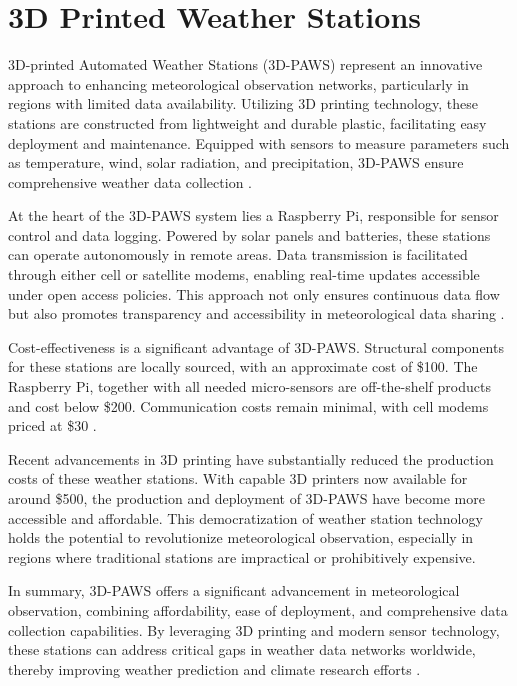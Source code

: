 \section{3D Printed Weather Stations}
\label{sec:3d_printed_stations}

3D-printed Automated Weather Stations (3D-PAWS) represent an innovative approach to enhancing meteorological observation networks, particularly in regions with limited data availability. Utilizing 3D printing technology, these stations are constructed from lightweight and durable plastic, facilitating easy deployment and maintenance. Equipped with sensors to measure parameters such as temperature, wind, solar radiation, and precipitation, 3D-PAWS ensure comprehensive weather data collection \cite{mwangi2017paws}.

At the heart of the 3D-PAWS system lies a Raspberry Pi, responsible for sensor control and data logging. Powered by solar panels and batteries, these stations can operate autonomously in remote areas. Data transmission is facilitated through either cell or satellite modems, enabling real-time updates accessible under open access policies. This approach not only ensures continuous data flow but also promotes transparency and accessibility in meteorological data sharing \cite{mwangi2017paws}.

Cost-effectiveness is a significant advantage of 3D-PAWS. Structural components for these stations are locally sourced, with an approximate cost of \$100. The Raspberry Pi, together with all needed micro-sensors are off-the-shelf products and cost below \$200. Communication costs remain minimal, with cell modems priced at \$30 \cite{mwangi2017paws}.

Recent advancements in 3D printing have substantially reduced the production costs of these weather stations. With capable 3D printers now available for around \$500, the production and deployment of 3D-PAWS have become more accessible and affordable. This democratization of weather station technology holds the potential to revolutionize meteorological observation, especially in regions where traditional stations are impractical or prohibitively expensive.

In summary, 3D-PAWS offers a significant advancement in meteorological observation, combining affordability, ease of deployment, and comprehensive data collection capabilities. By leveraging 3D printing and modern sensor technology, these stations can address critical gaps in weather data networks worldwide, thereby improving weather prediction and climate research efforts \cite{muita2021}.

